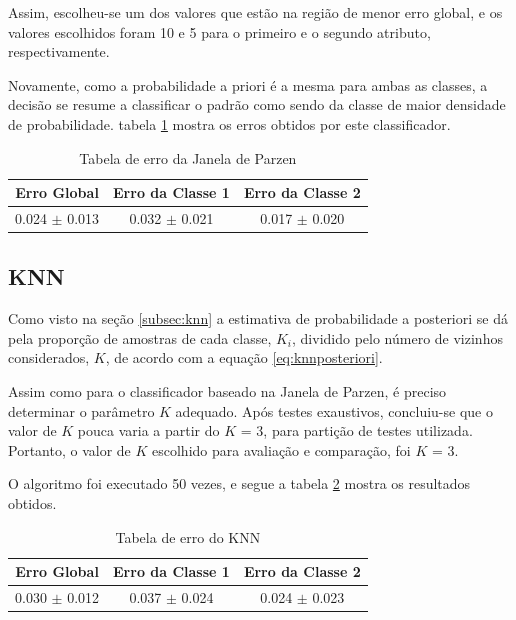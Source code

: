 Assim, escolheu-se um dos valores que estão na região de menor erro global, e os valores escolhidos foram 10 e 5 para o primeiro e o segundo atributo, respectivamente.

Novamente, como a probabilidade a priori é a mesma para ambas as classes, a decisão se resume a classificar o padrão como sendo da classe de maior densidade de probabilidade. tabela \ref{tab:erro-janela-parzen} mostra os erros obtidos por este classificador.

\begin{table}[H]
\begin{center}
\begin{tabular}{|c|c|c|}
\hline
Erro Global			&	Erro da Classe 1	&	Erro da Classe 2	\\
\hline %
0.024 $\pm$ 0.013	&	0.032 $\pm$ 0.021	&	0.017 $\pm$ 0.020	\\
\hline
\end{tabular}%
\end{center}   %
\caption{Tabela de erro da Janela de Parzen}
\label{tab:erro-janela-parzen}
\end{table}

\subsection{KNN}
\label{subsec:exp-knn}

Como visto na seção \ref{subsec:knn} a estimativa de probabilidade a posteriori se dá pela proporção de amostras de cada classe, $K_i$, dividido pelo número de vizinhos considerados, $K$, de acordo com a equação \ref{eq:knnposteriori}.

Assim como para o classificador baseado na Janela de Parzen, é preciso determinar o parâmetro $K$ adequado. Após testes exaustivos, concluiu-se que o valor de $K$ pouca varia a partir do $K$ = 3, para partição de testes utilizada. Portanto, o valor de $K$ escolhido para avaliação e comparação, foi $K$ = 3.

O algoritmo foi executado 50 vezes, e segue a tabela \ref{tab:erro-knn} mostra os resultados obtidos.

\begin{table}[H]
\begin{center}
\begin{tabular}{|c|c|c|}
\hline
Erro Global			&	Erro da Classe 1	&	Erro da Classe 2	\\
\hline %
0.030 $\pm$ 0.012	&	0.037 $\pm$ 0.024	&	0.024 $\pm$ 0.023	\\
\hline
\end{tabular}%
\end{center}   %
\caption{Tabela de erro do KNN}
\label{tab:erro-knn}
\end{table}


